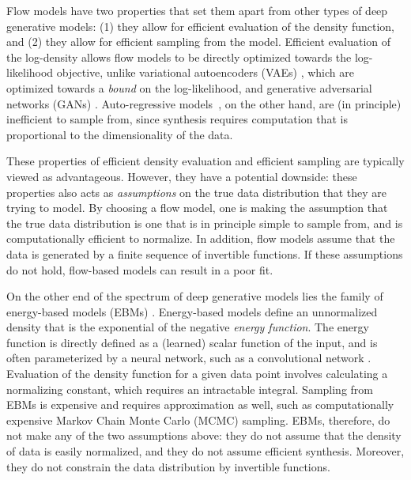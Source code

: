\documentclass[10pt,twocolumn,letterpaper]{article}
\begin{document}
Flow models have two properties that set them apart from other types of deep generative models: (1) they allow for efficient evaluation of the density function, and (2) they allow for efficient sampling from the model. Efficient evaluation of the log-density allows flow models to be directly optimized towards the log-likelihood objective, unlike variational autoencoders (VAEs) \cite{kingma2013auto, rezende2014stochastic}, which are optimized towards a \emph{bound} on the log-likelihood, and generative adversarial networks (GANs) \cite{goodfellow2014generative}. Auto-regressive models~\cite{graves2013generating,oord2016wavenet,salimans2017pixelcnn}, on the other hand, are (in principle) inefficient to sample from, since synthesis requires computation that is proportional to the dimensionality of the data.

These properties of efficient density evaluation and efficient sampling are typically viewed as advantageous. However, they have a potential downside: these properties also acts as \emph{assumptions} on the true data distribution that they are trying to model. By choosing a flow model, one is making the assumption that the true data distribution is one that is in principle simple to sample from, and is computationally efficient to normalize. In addition, flow models assume that the data is generated by a finite sequence of invertible functions. If these assumptions do not hold, flow-based models can result in a poor fit. 

On the other end of the spectrum of deep generative models lies the family of energy-based models (EBMs) \cite{lecun2006tutorial,ngiam2011learning,kim2016deep,zhao2016energy,xie2016theory,gao2018learning,kumar2019maximum,nijkamp2019learning,du2019implicit,finn2016connection,goyal2017variational,grathwohl2019your,desjardins2011tracking}.
Energy-based models define an unnormalized density that is the exponential of the negative \emph{energy function}. The energy function is directly defined as a (learned) scalar function of the input, and is often parameterized by a neural network, such as a convolutional network \cite{lecun1998gradient,krizhevsky2012imagenet}.
Evaluation of the density function for a given data point involves calculating a normalizing constant, which requires an intractable integral. Sampling from EBMs is expensive and requires approximation as well, such as computationally expensive Markov Chain Monte Carlo (MCMC) sampling.  
EBMs, therefore, do not make any of the two assumptions above: they do not assume that the density of data is easily normalized, and they do not assume efficient synthesis. Moreover, they do not constrain the data distribution by invertible functions.  
\end{document}
